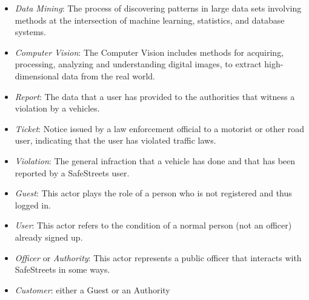 \begin{itemize}
	\item \textit{Data Mining}: The process of discovering patterns in large data sets involving methods at the intersection of machine learning, statistics, and database systems.
	\item \textit{Computer Vision}: The Computer Vision includes methods for acquiring, processing, analyzing and understanding digital images, to extract high-dimensional data from the real world.
	\item \textit{Report}: The data that a user has provided to the authorities that witness a violation by a vehicles.
	\item \textit{Ticket}: Notice issued by a law enforcement official to a motorist or other road user, indicating that the user has violated traffic laws.
	\item \textit{Violation}: The general infraction that a vehicle has done and that has been reported by a SafeStreets user.
	\item \textit{Guest}: This actor plays the role of a person who is not registered and thus logged in.
	\item \textit{User}: This actor refers to the condition of a normal person (not an officer) already signed up.
	\item \textit{Officer} or \textit{Authority}: This actor represents a public officer that interacts with SafeStreets in some ways.
	\item \textit{Customer}: either a Guest or an Authority
\end{itemize}